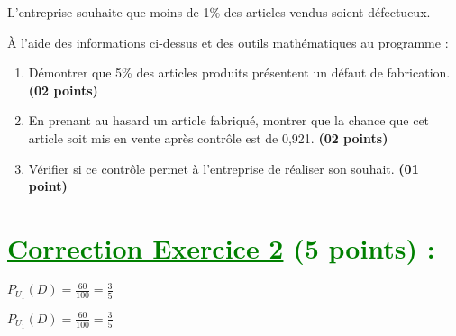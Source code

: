 \documentclass[12pt]{article}
\begin{document}
L’entreprise souhaite que moins de 1\% des articles vendus soient défectueux.

À l’aide des informations ci-dessus et des outils mathématiques au programme :
\begin{enumerate}
    \item Démontrer que 5\% des articles produits présentent un défaut de fabrication. \textbf{(02 points)}
    \item En prenant au hasard un article fabriqué, montrer que la chance que cet article soit mis en vente après contrôle est de 0,921. \textbf{(02 points)}
    \item Vérifier si ce contrôle permet à l’entreprise de réaliser son souhait. \textbf{(01 point)}
\end{enumerate}

\section*{\textcolor{green}{\underline{Correction Exercice 2} (5 points) :}}
$P_{U_{1}}(D)=\frac{60}{100}=\frac{3}{5}$

$P_{U_{1}}(D)=\frac{60}{100}=\frac{3}{5}$
\end{document}
